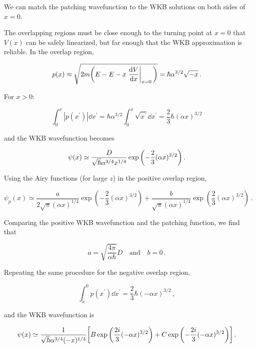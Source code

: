 \documentclass[12pt, titlepage]{article}
\begin{document}
We can match the patching wavefunction to the WKB solutions on both sides of $x=0$.


The overlapping regions must be close enough to the turning point at $x=0$ that $V(x)$ can be safely linearized, but far enough that the WKB approximation is reliable. In the overlap region,

\begin{equation}
	p(x) \approx \sqrt{2m\qty(E - E - x\eval{\dv{V}{x}}_{x=0}\,)} = \hbar \alpha^{3/2} \sqrt{-x} \,.
\end{equation}  

For $x > 0$:

\begin{equation}
	\int_{0}^{x} |p(x^\prime)|\dd{x^\prime} = \hbar\alpha^{3/2}\int_{0}^{x}\sqrt{x^\prime}\dd{x^\prime} = \frac{2}{3}\hbar(\alpha x)^{3/2}
\end{equation}

and the WKB wavefunction becomes

\begin{equation}
	\psi(x)\simeq \frac{D}{\sqrt{\hbar}\alpha^{3/4}x^{1/4}}\exp\qty(-\frac{2}{3}(\alpha x)^{3/2}) \,.
\end{equation}

Using the Airy functions (for large $z$) in the positive overlap region, 

\begin{equation}
	\psi_p(x)\simeq \frac{a}{2\sqrt{\pi}(\alpha x)^{1/4}}\exp(-\frac{2}{3}(\alpha x)^{3/2}) + \frac{b}{\sqrt{\pi}(\alpha x)^{1/4}}\exp(\frac{2}{3}(\alpha x)^{3/2}) \,.
\end{equation}

Comparing the positive WKB wavefunction and the patching function, we find that

\begin{equation}
	a = \sqrt{\frac{4\pi}{\alpha\hbar}} D \quad\text{and}\quad b = 0 \,.
\end{equation}

Repeating the same procedure for the negative overlap region,

\begin{equation}
	\int_{x}^{0}p(x^\prime)\dd{x^\prime} = \frac{2}{3}\hbar(-\alpha x)^{3/2} \,,
\end{equation}

and the WKB wavefunction is 

\begin{equation}
	\psi(x)\simeq \frac{1}{\sqrt{\hbar}\alpha^{3/4}(-x)^{1/4}}\qty[B\exp\qty(\frac{2i}{3}(-\alpha x)^{3/2}) + C\exp\qty(-\frac{2i}{3}(-\alpha x)^{3/2})] \,.
\end{equation}
\end{document}
